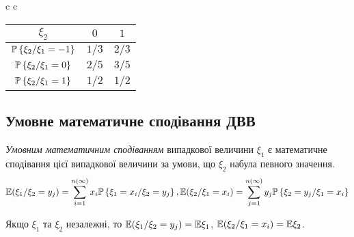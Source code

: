 \begin{example}
\begin{center}
\begin{tabular}{c c}
\begin{tabular}{|c|c|c|}
                \hline
                $\xi_2$ & $0$ & $1$ \\
                \hline
                $\P\left\{\xi_2 / \xi_1 = -1\right\}$ & $1/3$ 
                & $2/3$ \\
                \hline
                $\P\left\{\xi_2 / \xi_1 = 0\right\}$ & $2/5$ 
                & $3/5$\\
                \hline
                $\P\left\{\xi_2 / \xi_1 = 1\right\}$ & $1/2$ 
                & $1/2$\\
                \hline
            \end{tabular}
        \end{tabular}
    \end{center}  
\end{example}

\subsection{Умовне математичне сподівання ДВВ}
\begin{definition}
    \emph{Умовним математичним сподіванням} випадкової величини $\xi_1$ 
    є математичне сподівання цієї випадкової величини за умови, що 
    $\xi_2$ набула певного значення.
    $$\E(\xi_1 / \xi_2 = y_j) =
\sum\limits_{i=1}^{n(\infty)}x_i 
\P\left\{\xi_1 = x_i / \xi_2 = y_j\right\}, 
\E(\xi_2 / \xi_1 = x_i) = \sum\limits_{j=1}^{n(\infty)}y_j 
\P\left\{\xi_2 = y_j / \xi_1 = x_i\right\}$$
\end{definition}

\begin{remark}
    Якщо $\xi_1$ та $\xi_2$ незалежні, то $\E(\xi_1 / \xi_2 = y_j) 
    = \E\xi_1$, $\E(\xi_2 / \xi_1 = x_i) = \E\xi_2$.
\end{remark}

